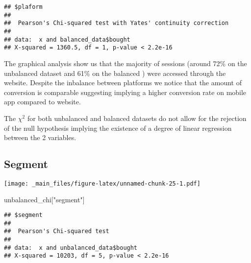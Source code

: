 \documentclass[
]{book}
\newenvironment{Shaded}{\begin{snugshade}}{\end{snugshade}}
\newcommand{\FunctionTok}[1]{\textcolor[rgb]{0.00,0.00,0.00}{#1}}
\newcommand{\NormalTok}[1]{#1}
\newcommand{\SpecialCharTok}[1]{\textcolor[rgb]{0.00,0.00,0.00}{#1}}
\newcommand{\StringTok}[1]{\textcolor[rgb]{0.31,0.60,0.02}{#1}}
\begin{document}
\begin{verbatim}
## $plaform
## 
##  Pearson's Chi-squared test with Yates' continuity correction
## 
## data:  x and balanced_data$bought
## X-squared = 1360.5, df = 1, p-value < 2.2e-16
\end{verbatim}

The graphical analysis show us that the majority of sessions (around 72\% on the unbalanced dataset and 61\% on the balanced ) were accessed through the website. Despite the inbalance between platforms we notice that the amount of conversion is comparable suggesting implying a higher conversion rate on mobile app compared to website.

The \(\chi ^2\) for both unbalanced and balanced datasets do not allow for the rejection of the null hypothesis implying the existence of a degree of linear regression between the 2 variables.

\hypertarget{segment}{%
\subsection{Segment}\label{segment}}

\begin{Shaded}
\end{Shaded}

\texttt{[image: \_main\_files/figure-latex/unnamed-chunk-25-1.pdf]}

\begin{Shaded}
\begin{Highlighting}[]
\NormalTok{unbalanced\_chi[}\StringTok{"segment"}\NormalTok{]}
\end{Highlighting}
\end{Shaded}

\begin{verbatim}
## $segment
## 
##  Pearson's Chi-squared test
## 
## data:  x and unbalanced_data$bought
## X-squared = 10203, df = 5, p-value < 2.2e-16
\end{verbatim}

\begin{Shaded}
\end{Shaded}
\end{document}
